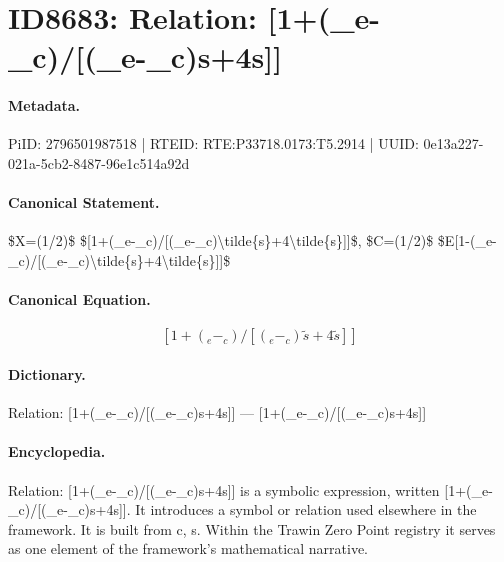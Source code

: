\section*{ID8683: Relation: [1+(\_e-\_c)/[(\_e-\_c)s+4s]]}
\paragraph{Metadata.}
PiID: 2796501987518 | RTEID: RTE:P33718.0173:T5.2914 | UUID: 0e13a227-021a-5cb2-8487-96e1c514a92d

\paragraph{Canonical Statement.}
\$X=(1/2)\$ \$[1+(\_e-\_c)/[(\_e-\_c)\textbackslash{}tilde\{s\}+4\textbackslash{}tilde\{s\}]]\$, \$C=(1/2)\$ \$E[1-(\_e-\_c)/[(\_e-\_c)\textbackslash{}tilde\{s\}+4\textbackslash{}tilde\{s\}]]\$

\paragraph{Canonical Equation.}
\[
[1+(_e-_c)/[(_e-_c)\tilde{s}+4\tilde{s}]]
\]

\paragraph{Dictionary.}
Relation: [1+(\_e-\_c)/[(\_e-\_c)s+4s]] — [1+(\_e-\_c)/[(\_e-\_c)s+4s]]

\paragraph{Encyclopedia.}
Relation: [1+(\_e-\_c)/[(\_e-\_c)s+4s]] is a symbolic expression, written [1+(\_e-\_c)/[(\_e-\_c)s+4s]]. It introduces a symbol or relation used elsewhere in the framework. It is built from c, s. Within the Trawin Zero Point registry it serves as one element of the framework's mathematical narrative.
